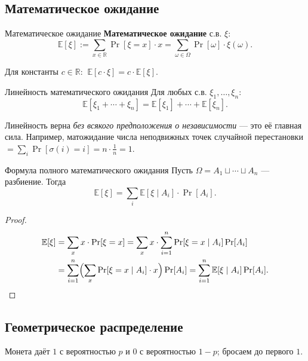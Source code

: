 \subsection{Математическое ожидание}

\begin{Definition}{Математическое ожидание}{}
	\textbf{Математическое ожидание} с.в. $\xi$:
	\[
	\mathbb{E}[\xi]:=\sum_{x\in\mathbb{R}}\Pr[\xi=x]\cdot x=\sum_{\omega\in\Omega}\Pr[\omega]\cdot\xi(\omega).
	\]
\end{Definition}

\begin{Statement}{}{}
	Для константы $c\in\mathbb{R}$: $\ \mathbb{E}[c\cdot\xi]=c\cdot\mathbb{E}[\xi]$.
\end{Statement}

\begin{Statement}{Линейность математического ожидания}{}
	Для любых с.в. $\xi_1,\dots,\xi_n$:
	\[
	\mathbb{E}[\xi_1+\cdots+\xi_n]=\mathbb{E}[\xi_1]+\cdots+\mathbb{E}[\xi_n].
	\]
\end{Statement}

\begin{Remark}{}{}
	Линейность верна \emph{без всякого предположения о независимости} — это её главная сила. Например, матожидание числа неподвижных точек случайной перестановки $=\sum_i\Pr[\sigma(i)=i]=n\cdot\tfrac1n=1$.
\end{Remark}

\begin{Theorem}{Формула полного математического ожидания}{}
	Пусть $\Omega=A_1\sqcup\cdots\sqcup A_n$ — разбиение. Тогда
	\[
	\mathbb{E}[\xi]=\sum_i\mathbb{E}[\xi\mid A_i]\cdot\Pr[A_i].
	\]
\end{Theorem}

\begin{proof}
	\begin{align*}
		\mathbb{E}[\xi]
		&=\sum_x x\cdot\Pr[\xi=x]
		=\sum_x x\cdot\sum_{i=1}^n\Pr[\xi=x\mid A_i]\Pr[A_i]\\
		&=\sum_{i=1}^n\Bigl(\sum_x \Pr[\xi=x\mid A_i]\cdot x\Bigr)\Pr[A_i]
		=\sum_{i=1}^n\mathbb{E}[\xi\mid A_i]\Pr[A_i].
	\end{align*}
\end{proof}

\subsection{Геометрическое распределение}

Монета даёт $1$ с вероятностью $p$ и $0$ с вероятностью $1-p$; бросаем до первого $1$.

